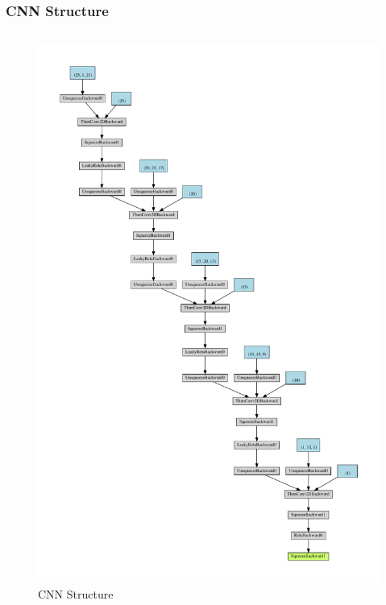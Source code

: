 \documentclass[handout]{beamer}
\begin{document}
\begin{frame}
\frametitle{CNN Structure}
\begin{columns}
\begin{figure}[H]
    \centering
    \caption{CNN Structure}
    \includegraphics[width=1.0\textwidth]{img/model.pdf}
\end{figure}

\end{columns}
\end{frame}
\end{document}
